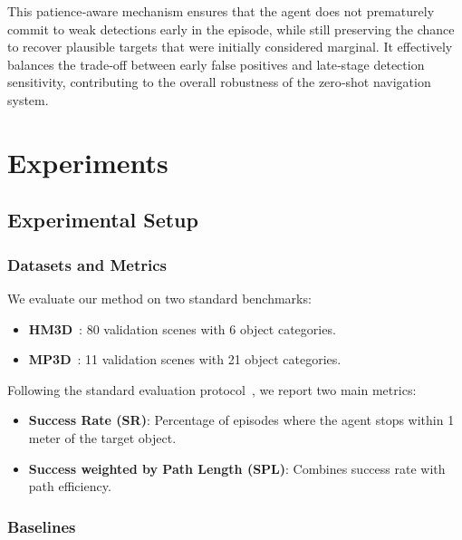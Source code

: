 \documentclass[conference]{IEEEtran}
\begin{document}
This patience‑aware mechanism ensures that the agent does not prematurely commit to weak detections early in the episode, while still preserving the chance to recover plausible targets that were initially considered marginal. It effectively balances the trade‑off between early false positives and late‑stage detection sensitivity, contributing to the overall robustness of the zero‑shot navigation system.

\section{Experiments}
\label{sec:experiments}

\subsection{Experimental Setup}

\subsubsection{Datasets and Metrics}

We evaluate our method on two standard benchmarks:
\begin{itemize}
    \item \textbf{HM3D}~\cite{ramakrishnan2021hm3d}: 80 validation scenes with 6 object categories.
    \item \textbf{MP3D}~\cite{chang2017matterport3d}: 11 validation scenes with 21 object categories.
\end{itemize}

Following the standard evaluation protocol~\cite{batra2020objectnav}, we report two main metrics:
\begin{itemize}
    \item \textbf{Success Rate (SR)}: Percentage of episodes where the agent stops within 1 meter of the target object.
    \item \textbf{Success weighted by Path Length (SPL)}: Combines success rate with path efficiency.
\end{itemize}

\subsubsection{Baselines}
\end{document}
